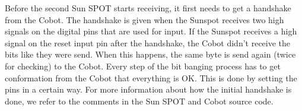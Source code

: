 \documentclass[a4paper,10pt]{article} %
\begin{document}
Before the second Sun SPOT starts receiving, it first needs to get a handshake
from the Cobot. The handshake is given when the Sunspot receives two high
signals on the digital pins that are used for input. If the Sunspot receives a
high signal on the reset input pin after the handshake, the Cobot didn't receive
the bits like they were send. When this happens, the same byte is send again
(twice for checking) to the Cobot. Every step of the bit banging process has to
get conformation from the Cobot that everything is OK. This is done by setting
the pins in a certain way. For more information about how the initial handshake
is done, we refer to the comments in the Sun SPOT and Cobot source code.













\end{document}
